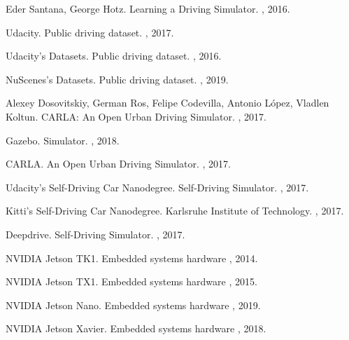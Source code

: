 \begin{thebibliography}{1}
Eder Santana, George Hotz.
\newblock Learning a Driving Simulator.
, 2016.

Udacity.
\newblock Public driving dataset.
, 2017.

Udacity's Datasets.
\newblock Public driving dataset.
, 2016.

NuScenes's Datasets.
\newblock Public driving dataset.
, 2019.

Alexey Dosovitskiy, German Ros, Felipe Codevilla, Antonio López, Vladlen Koltun.
\newblock CARLA: An Open Urban Driving Simulator.
, 2017.

Gazebo.
\newblock Simulator.
, 2018.

CARLA.
\newblock An Open Urban Driving Simulator.
, 2017.

 Udacity's Self-Driving Car Nanodegree.
\newblock Self-Driving Simulator.
, 2017.

Kitti's Self-Driving Car Nanodegree.
\newblock Karlsruhe Institute of Technology.
, 2017.


Deepdrive.
\newblock Self-Driving Simulator.
, 2017.

NVIDIA Jetson TK1.
\newblock Embedded systems hardware
, 2014.

NVIDIA Jetson TX1.
\newblock Embedded systems hardware
, 2015.

NVIDIA Jetson Nano.
\newblock Embedded systems hardware
, 2019.

NVIDIA Jetson Xavier.
\newblock Embedded systems hardware
, 2018.


\end{thebibliography}

